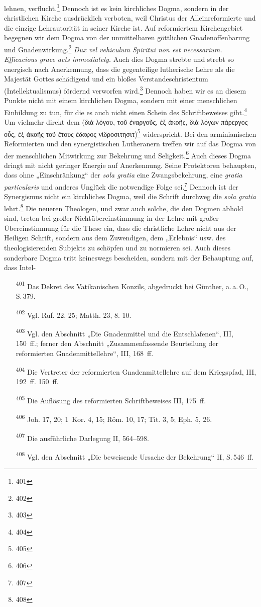 lehnen, verflucht.\footnote{401} Dennoch ist es kein kirchliches Dogma, sondern in der christlichen Kirche ausdrücklich verboten, weil Christus der Alleinreformierte und die einzige Lehrautorität in seiner Kirche ist. Auf reformiertem Kirchengebiet begegnen wir dem Dogma von der unmittelbaren göttlichen Gnadenoffenbarung und Gnadenwirkung.\footnote{402} \textit{Dux vel vehiculum Spiritui non est necessarium.} \textit{Efficacious grace acts immediately.} Auch dies Dogma strebte und strebt so energisch nach Anerkennung, dass die gegenteilige lutherische Lehre als die Majestät Gottes schädigend und ein bloßes Verstandeschristentum (Intellektualismus) fördernd verworfen wird.\footnote{403} Dennoch haben wir es an diesem Punkte nicht mit einem kirchlichen Dogma, sondern mit einer menschlichen Einbildung zu tun, für die es auch nicht einen Schein des Schriftbeweises gibt.\footnote{404} Um vielmehr direkt dem (\textgreek{διὰ λόγου}, \textgreek{τοῦ ἐναργοῦς}, \textgreek{ἐξ ἀκοῆς}, \textgreek{διὰ λόγων πάρεργος οὖς}, \textgreek{ἐξ ἀκοῆς τοῦ ἔτους ἔδαφος νίδροσιτησιτ})\footnote{405} widerspricht. Bei den arminianischen Reformierten und den synergistischen Lutheranern treffen wir auf das Dogma von der menschlichen Mitwirkung zur Bekehrung und Seligkeit.\footnote{406} Auch dieses Dogma dringt mit nicht geringer Energie auf Anerkennung. Seine Protektoren behaupten, dass ohne „Einschränkung“ der \textit{sola gratia} eine Zwangsbekehrung, eine \textit{gratia particularis} und anderes Unglück die notwendige Folge sei.\footnote{407} Dennoch ist der Synergismus nicht ein kirchliches Dogma, weil die Schrift durchweg die \textit{sola gratia} lehrt.\footnote{408} Die neueren Theologen, und zwar auch solche, die den Dogmen abhold sind, treten bei großer Nichtübereinstimmung in der Lehre mit großer Übereinstimmung für die These ein, dass die christliche Lehre nicht aus der Heiligen Schrift, sondern aus dem Zuwendigen, dem „Erlebnis“ usw. des theologisierenden Subjekts zu schöpfen und zu normieren sei. Auch dieses sonderbare Dogma tritt keineswegs bescheiden, sondern mit der Behauptung auf, dass Intel-\footnotesize \begin{enumerate} \item[\textsuperscript{401}] Das Dekret des Vatikanischen Konzils, abgedruckt bei Günther, a.\,a.\,O., S.\,379. \item[\textsuperscript{402}] Vgl. Ruf. 22, 25; Matth. 23, 8. 10. \item[\textsuperscript{403}] Vgl. den Abschnitt „Die Gnadenmittel und die Entschlafenen“, III, 150~ff.; ferner den Abschnitt „Zusammenfassende Beurteilung der reformierten Gnadenmittellehre“, III, 168~ff. \item[\textsuperscript{404}] Die Vertreter der reformierten Gnadenmittellehre auf dem Kriegspfad, III, 192~ff. 150~ff. \item[\textsuperscript{405}] Die Auflösung des reformierten Schriftbeweises III, 175~ff. \item[\textsuperscript{406}] Joh. 17, 20; 1~Kor. 4, 15; Röm. 10, 17; Tit. 3, 5; Eph. 5, 26. \item[\textsuperscript{407}] Die ausführliche Darlegung II, 564--598. \item[\textsuperscript{408}] Vgl. den Abschnitt „Die beweisende Ursache der Bekehrung“ II, S.\,546~ff. \end{enumerate}